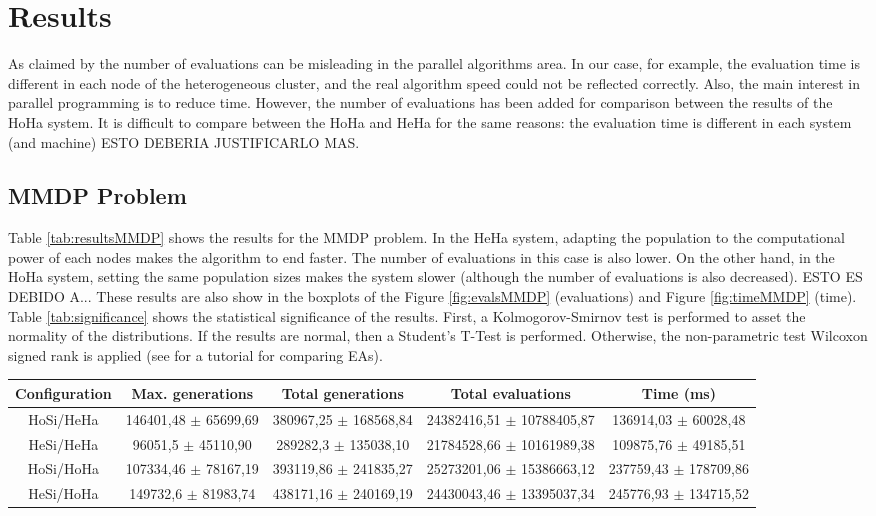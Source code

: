 \documentclass{sig-alternate}
\begin{document}
\section{Results}
\label{sec:results}

As claimed by \cite{EVALUATIONPARALLEL} the number of evaluations can be misleading in the parallel algorithms area. In our case, for example, the evaluation time is different in each node of the heterogeneous cluster, and the real algorithm speed could not be reflected correctly. Also, the main interest in parallel programming is to reduce time. However, the number of evaluations has been added for comparison between the results of the HoHa system. It is difficult to compare between the HoHa and HeHa for the same reasons: the evaluation time is different in each system (and machine) ESTO DEBERIA JUSTIFICARLO MAS.

\subsection{MMDP Problem}

Table \ref{tab:resultsMMDP} shows the results for the MMDP problem. In the HeHa system, adapting the population to the computational power of each nodes makes the algorithm to end faster. The number of evaluations in this case is also lower. On the other hand, in the HoHa system, setting the same population sizes makes the system slower (although the number of evaluations is also decreased). ESTO ES DEBIDO A... These results are also show in the boxplots of the Figure \ref{fig:evalsMMDP} (evaluations) and Figure \ref{fig:timeMMDP} (time). Table \ref{tab:significance} shows the statistical significance of the results. First, a Kolmogorov-Smirnov test is performed to asset the normality of the distributions. If the results are normal, then a Student's T-Test is performed. Otherwise, the non-parametric test Wilcoxon signed rank is applied (see \cite{TUTORIAL} for a tutorial for comparing EAs).

\begin{table*}
\centering
\caption{Results for the MMDP problem.}
\begin{tabular}{|c|c|c|c|c|} \hline
Configuration	& Max. generations			& Total generations			& 	Total evaluations			& Time (ms) \\ \hline
HoSi/HeHa		& 146401,48	$\pm$ 65699,69	& 380967,25	$\pm$ 168568,84	& 24382416,51 $\pm$	10788405,87	& 136914,03 $\pm$ 60028,48\\ \hline
HeSi/HeHa		& 96051,5	$\pm$ 45110,90	& 289282,3	$\pm$ 135038,10	& 21784528,66 $\pm$	10161989,38	& 109875,76 $\pm$ 49185,51\\ \hline \hline
HoSi/HoHa		& 107334,46 $\pm$ 78167,19  & 393119,86 $\pm$ 241835,27	& 25273201,06 $\pm$ 15386663,12	& 237759,43 $\pm$ 178709,86\\ \hline
HeSi/HoHa		& 149732,6 $\pm$ 81983,74	& 438171,16	$\pm$ 240169,19	& 24430043,46 $\pm$ 13395037,34	& 245776,93 $\pm$ 134715,52\\ \hline

\end{tabular}
\label{tab:resultsMMDP}
\end{table*}
\end{document}
